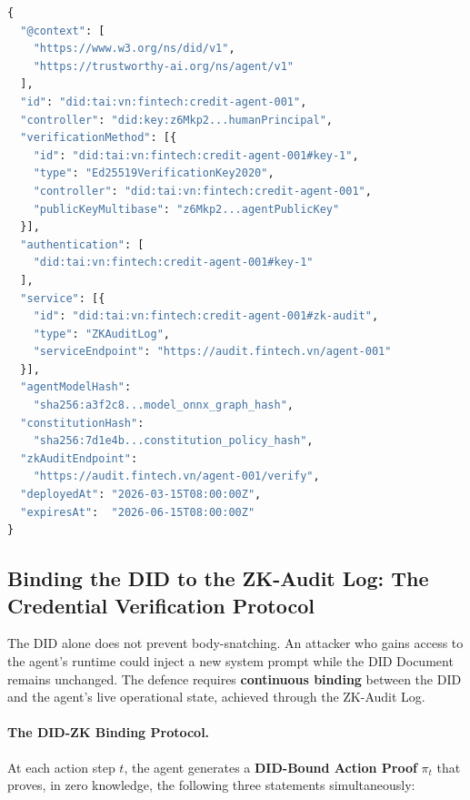 \begin{lstlisting}[language=Python, style=pythonstyle,
  caption={W3C DID Document for an autonomous AI agent,
           extended with model hash, constitution hash, and
           ZK-audit endpoint.},
  label={lst:did-document}
]
{
  "@context": [
    "https://www.w3.org/ns/did/v1",
    "https://trustworthy-ai.org/ns/agent/v1"
  ],
  "id": "did:tai:vn:fintech:credit-agent-001",
  "controller": "did:key:z6Mkp2...humanPrincipal",
  "verificationMethod": [{
    "id": "did:tai:vn:fintech:credit-agent-001#key-1",
    "type": "Ed25519VerificationKey2020",
    "controller": "did:tai:vn:fintech:credit-agent-001",
    "publicKeyMultibase": "z6Mkp2...agentPublicKey"
  }],
  "authentication": [
    "did:tai:vn:fintech:credit-agent-001#key-1"
  ],
  "service": [{
    "id": "did:tai:vn:fintech:credit-agent-001#zk-audit",
    "type": "ZKAuditLog",
    "serviceEndpoint": "https://audit.fintech.vn/agent-001"
  }],
  "agentModelHash":
    "sha256:a3f2c8...model_onnx_graph_hash",
  "constitutionHash":
    "sha256:7d1e4b...constitution_policy_hash",
  "zkAuditEndpoint":
    "https://audit.fintech.vn/agent-001/verify",
  "deployedAt": "2026-03-15T08:00:00Z",
  "expiresAt":  "2026-06-15T08:00:00Z"
}
\end{lstlisting}

\subsection{Binding the DID to the ZK-Audit Log:
            The Credential Verification Protocol}
\label{subsec:did-zk-binding}

The DID alone does not prevent body-snatching.
An attacker who gains access to the agent's runtime could
inject a new system prompt while the DID Document remains
unchanged.
The defence requires \textbf{continuous binding} between the
DID and the agent's live operational state, achieved through
the ZK-Audit Log.

\paragraph{The DID-ZK Binding Protocol.}
At each action step $t$, the agent generates a
\textbf{DID-Bound Action Proof} $\pi_t$ that proves, in zero
knowledge, the following three statements simultaneously:

